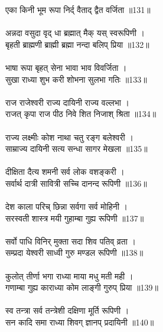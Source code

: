 एका किनी भूम रूपा निर्द् वैताद् द्वैत वर्जिता ॥131॥\\
\\
अन्नदा वसुदा वृद् धा ब्रह्मात् मैक् यस् स्वरूपिणी ।\\
बृहती ब्राह्मणी ब्राह्मी ब्रह्मा नन्दा बलिप् प्रिया ॥132॥\\
\\
भाषा रूपा बृहत् सेना भावा भाव विवर्जिता ।\\
सुखा राध्या शुभ करी शोभना सुलभा गतिः ॥133॥\\
\\
राज राजेश्वरी राज्य दायिनी राज्य वल्लभा ।\\
राजत् कृपा राज पीठ निवे शित निजाश् श्रिता ॥134॥\\
\\
राज्य लक्ष्मीः कोश नाथा चतु रङ्ग बलेश्वरी ।\\
साम्राज्य दायिनी सत्य सन्धा सागर मेखला ॥135॥\\
\\
दीक्षिता दैत्य शमनी सर्व लोक वशङ्करी ।\\
सर्वार्थ दात्री सावित्री सच्चि दानन्द रूपिणी ॥136॥\\
\\
देश काला परिच् छिन्ना सर्वगा सर्व मोहिनी ।\\
सरस्वती शास्त्र मयी गुहाम्बा गुह्य रूपिणी ॥137॥\\
\\
सर्वो पाधि विनिर् मुक्ता सदा शिव पतिव् व्रता ।\\
सम्प्रदा येश्वरी साध्वी गुरु मण्डल रूपिणी ॥138॥\\
\\
कुलोत् तीर्णा भगा राध्या माया मधु मती मही ।\\
गणाम्बा गुह्य काराध्या कोम लाङ्गी गुरुप् प्रिया ॥139॥\\
\\
स्व तन्त्रा सर्व तन्त्रेशी दक्षिणा मूर्ति रूपिणी ।\\
सन कादि समा राध्या शिवग् ज्ञानप् प्रदायिनी ॥140॥\\
